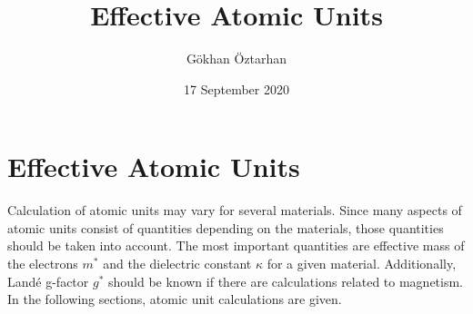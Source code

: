 \documentclass[a4paper,12pt]{report}
\title{Effective Atomic Units}
\author{Gökhan Öztarhan}
\date{17 September 2020}
\begin{document}
\maketitle

\chapter*{Effective Atomic Units}

Calculation of atomic units may vary for several materials. Since many aspects
of atomic units consist of quantities depending on the materials,
those quantities should be taken into account. The most important quantities
are effective mass of the electrons $m^{*}$ and the dielectric constant $\kappa$
for a given material. Additionally, Landé g-factor $g^{*}$ should be known if
there are calculations related to magnetism. In the following sections,
atomic unit calculations are given.
\end{document}
